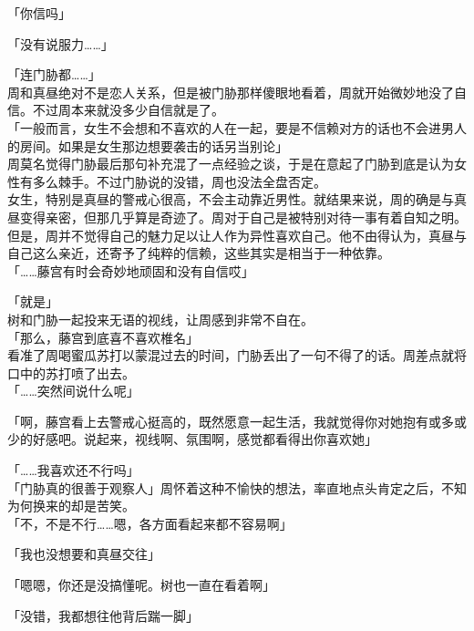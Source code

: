 「你信吗」

「没有说服力……」

「连门胁都……」\\

周和真昼绝对不是恋人关系，但是被门胁那样傻眼地看着，周就开始微妙地没了自信。不过周本来就没多少自信就是了。\\

「一般而言，女生不会想和不喜欢的人在一起，要是不信赖对方的话也不会进男人的房间。如果是女生那边想要袭击的话另当别论」\\

周莫名觉得门胁最后那句补充混了一点经验之谈，于是在意起了门胁到底是认为女性有多么棘手。不过门胁说的没错，周也没法全盘否定。\\

女生，特别是真昼的警戒心很高，不会主动靠近男性。就结果来说，周的确是与真昼变得亲密，但那几乎算是奇迹了。周对于自己是被特别对待一事有着自知之明。\\

但是，周并不觉得自己的魅力足以让人作为异性喜欢自己。他不由得认为，真昼与自己这么亲近，还寄予了纯粹的信赖，这些其实是相当于一种依靠。\\

「……藤宫有时会奇妙地顽固和没有自信哎」

「就是」\\

树和门胁一起投来无语的视线，让周感到非常不自在。\\

「那么，藤宫到底喜不喜欢椎名」\\

看准了周喝蜜瓜苏打以蒙混过去的时间，门胁丢出了一句不得了的话。周差点就将口中的苏打喷了出去。\\

「……突然间说什么呢」

「啊，藤宫看上去警戒心挺高的，既然愿意一起生活，我就觉得你对她抱有或多或少的好感吧。说起来，视线啊、氛围啊，感觉都看得出你喜欢她」

「……我喜欢还不行吗」\\

「门胁真的很善于观察人」周怀着这种不愉快的想法，率直地点头肯定之后，不知为何换来的却是苦笑。\\

「不，不是不行……嗯，各方面看起来都不容易啊」

「我也没想要和真昼交往」

「嗯嗯，你还是没搞懂呢。树也一直在看着啊」

「没错，我都想往他背后踹一脚」

